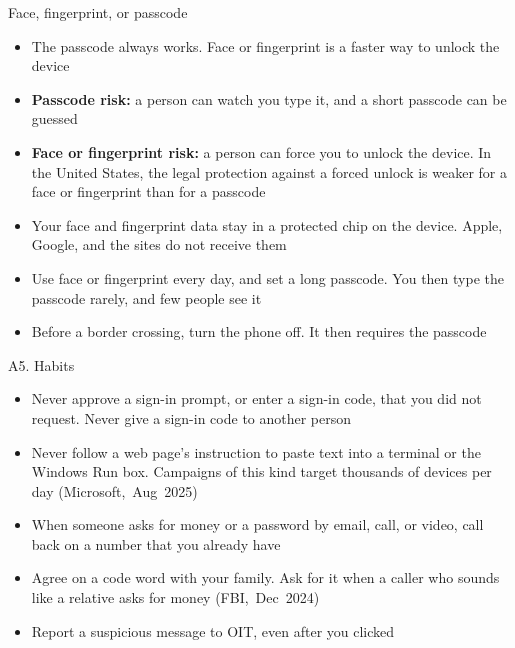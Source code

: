 \documentclass[11pt]{beamer}
\newcommand{\srccite}[1]{{\scriptsize\textcolor{citecol}{#1}}}
\newcommand{\vfy}{\unskip}
\newcommand{\vfy}{\unskip\nobreakspace{\scriptsize\textcolor{citecol}{[verify]}}}
\renewcommand{\srccite}[1]{{\scriptsize\textcolor{citecol}{\mbox{#1}}}}
\begin{document}
\begin{frame}{Face, fingerprint, or passcode}
\pause
\begin{itemize}\setlength\itemsep{8pt}
\item The passcode always works. Face or fingerprint is a faster way to unlock the device \pause
\item \textbf{Passcode risk:} a person can watch you type it, and a short passcode can be guessed \pause
\item \textbf{Face or fingerprint risk:} a person can force you to unlock the device. In the United States, the legal protection against a forced unlock is weaker for a face or fingerprint than for a passcode \vfy \pause
\item Your face and fingerprint data stay in a protected chip on the device. Apple, Google, and the sites do not receive them \vfy \pause
\item[$\rightarrow$] Use face or fingerprint every day, and set a long passcode. You then type the passcode rarely, and few people see it \pause
\item[$\rightarrow$] Before a border crossing, turn the phone off. It then requires the passcode
\end{itemize}
\end{frame}


\begin{frame}{A5. Habits}
\pause
\begin{itemize}\setlength\itemsep{9pt}
\item Never approve a sign-in prompt, or enter a sign-in code, that you did not request. Never give a sign-in code to another person \pause
\item Never follow a web page's instruction to paste text into a terminal or the Windows Run box. Campaigns of this kind target thousands of devices per day \srccite{(Microsoft, Aug 2025)} \pause
\item When someone asks for money or a password by email, call, or video, call back on a number that you already have \pause
\item Agree on a code word with your family. Ask for it when a caller who sounds like a relative asks for money \srccite{(FBI, Dec 2024)} \vfy \pause
\item[$\rightarrow$] Report a suspicious message to OIT, even after you clicked
\end{itemize}
\end{frame}
\end{document}
